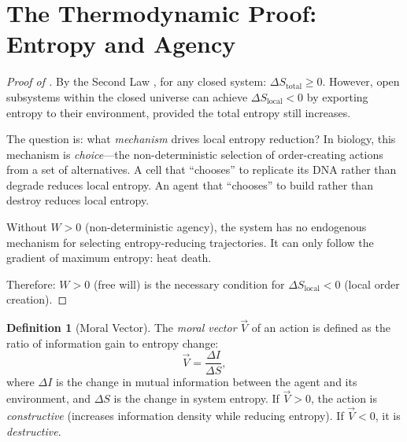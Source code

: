 \documentclass[12pt, a4paper]{article}
\theoremstyle{plain}
\theoremstyle{definition}
\newtheorem{definition}[theorem]{Definition}
\theoremstyle{remark}
\begin{document}
\section{The Thermodynamic Proof: Entropy and Agency}\label{sec:thermo}

\begin{proof}[Proof of ]
  By the Second Law \citep{Clausius1865}, for any closed system:
  $\Delta S_{\text{total}} \geq 0$. However, open subsystems within the
  closed universe can achieve $\Delta S_{\text{local}} < 0$ by exporting
  entropy to their environment, provided the total entropy still increases.

  The question is: what \emph{mechanism} drives local entropy reduction?
  In biology, this mechanism is \emph{choice}---the non-deterministic
  selection of order-creating actions from a set of alternatives. A cell
  that ``chooses'' to replicate its DNA rather than degrade reduces local
  entropy. An agent that ``chooses'' to build rather than destroy reduces
  local entropy.

  Without $W > 0$ (non-deterministic agency), the system has no endogenous
  mechanism for selecting entropy-reducing trajectories. It can only follow
  the gradient of maximum entropy: heat death.

  Therefore: $W > 0$ (free will) is the necessary condition for
  $\Delta S_{\text{local}} < 0$ (local order creation). \qedhere
\end{proof}

\begin{definition}[Moral Vector]\label{def:moral_vector}
  The \emph{moral vector} $\vec{V}$ of an action is defined as the ratio
  of information gain to entropy change:
  \begin{equation}\label{eq:moral_vector}
    \vec{V} = \frac{\Delta I}{\Delta S},
  \end{equation}
  where $\Delta I$ is the change in mutual information between the agent
  and its environment, and $\Delta S$ is the change in system entropy.
  If $\vec{V} > 0$, the action is \emph{constructive} (increases information
  density while reducing entropy). If $\vec{V} < 0$, it is \emph{destructive}.
\end{definition}

\end{document}
